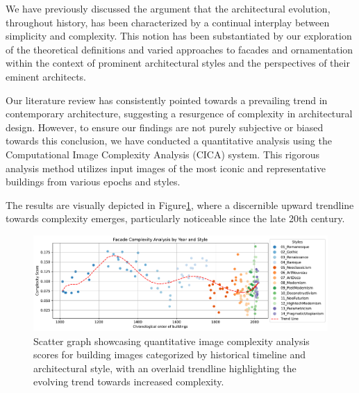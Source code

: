 %    


We have previously discussed the argument that the architectural evolution, throughout history, has been characterized by a continual interplay between simplicity and complexity.
This notion has been substantiated by our exploration of the theoretical definitions and varied approaches to facades and ornamentation within the context of prominent architectural styles and the perspectives of their eminent architects.

Our literature review has consistently pointed towards a prevailing trend in contemporary architecture, suggesting a resurgence of complexity in architectural design.
However, to ensure our findings are not purely subjective or biased towards this conclusion, we have conducted a quantitative analysis using the Computational Image Complexity Analysis (CICA) system.
This rigorous analysis method utilizes input images of the most iconic and representative buildings from various epochs and styles.

The results are visually depicted in Figure\ref{fig:complexitygraph}, where a discernible upward trendline towards complexity emerges, particularly noticeable since the late 20th century.

     \begin{figure}[!htb]
          \centering
          \includegraphics[width= \linewidth]{Graphs/complexitygraph}
          \caption{Scatter graph showcasing quantitative image complexity analysis scores for building images categorized by historical timeline and architectural style, with an overlaid trendline highlighting the evolving trend towards increased complexity.}
          \label{fig:complexitygraph}
     \end{figure}








